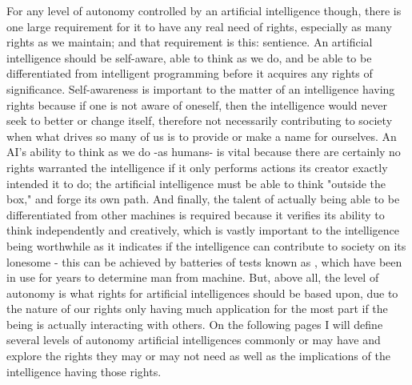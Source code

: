 For any level of autonomy controlled by an artificial intelligence though, there is one large requirement for it to have any real need of rights, especially as many rights as we maintain; and that requirement is this: sentience. An artificial intelligence should be self-aware, able to think as we do, and be able to be differentiated from intelligent programming before it acquires any rights of significance. Self-awareness is important to the matter of an intelligence having rights because if one is not aware of oneself, then the intelligence would never seek to better or change itself, therefore not necessarily contributing to society when what drives so many of us is to provide or make a name for ourselves. An AI's ability to think as we do -as humans- is vital because there are certainly no rights warranted the intelligence if it only performs actions its creator exactly intended it to do; the artificial intelligence must be able to think "outside the box," and forge its own path. And finally, the talent of actually being able to be differentiated from other machines is required because it verifies its ability to think independently and creatively, which is vastly important to the intelligence being worthwhile as it indicates if the intelligence can contribute to society on its lonesome - this can be achieved by batteries of tests known as \cite{sep-turing-test}, which have been in use for years to determine man from machine. But, above all, the level of autonomy is what rights for artificial intelligences should be based upon, due to the nature of our rights only having much application for the most part if the being is actually interacting with others. On the following pages I will define several levels of autonomy artificial intelligences commonly or may have and explore the rights they may or may not need as well as the implications of the intelligence having those rights.